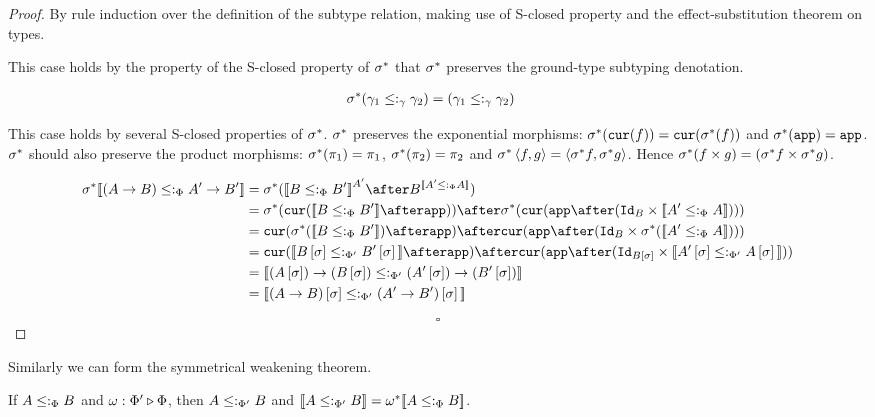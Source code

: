 \documentclass{Report}
\begin{document}
\begin{proof}
    By rule induction over the definition of the subtype relation, making use of S-closed property and the effect-substitution theorem on types.


This case holds by the property of the S-closed property of $\sigma^*$ that $\sigma^*$ preserves the ground-type subtyping denotation.

\begin{align}
    \sigma^*(\gamma_1\leq:_\gamma\gamma_2) &= (\gamma_1\leq:_\gamma\gamma_2)
\end{align}




This case holds by several S-closed properties of $\sigma^*$. $\sigma^*$ preserves the exponential morphisms: $\sigma^*(\texttt{cur}(f)) = \texttt{cur}(\sigma^*(f))$ and $\sigma^*(\texttt{app}) = \texttt{app}$. $\sigma^*$ should also preserve the product morphisms: $\sigma^*(\pi_1) = \pi_1$, $\sigma^*(\pi_2) = \pi_2$ and $\sigma^*\left\langle f, g\right\rangle = \left\langle\sigma^* f, \sigma^* g\right\rangle$. Hence $\sigma^*(f \times g) = (\sigma^* f \times \sigma^* g)$.

\begin{align}
    \si\star\deno{(\ab)\subtypep\fntype{A'}{B'}} &= \si\star(\deno{B\subtypep B'}^{A'}\after B^{\deno{A'\subtypep A}})\\
    &= \si\star(\cur{\deno{B\subtypep B'}\after\app})\after\si\star(\cur{\app\after(\Id{B}\times\deno{A'\subtypep A})})\\
    & = \cur{\si\star(\deno{B\subtypep B'})\after\app}\after\cur{\app\after(\Id{B}\times\si\star(\deno{A'\subtypep A}))}\\
    & = \cur{\deno{B\ssi\subtypepp B'\ssi}\after\app}\after\cur{\app\after(\Id{B\ssi}\times\deno{A'\ssi\subtypepp A\ssi})}\\
    &= \deno{\fntype{(A\ssi)}{(B\ssi)}\subtypepp\fntype{(A'\ssi)}{(B'\ssi)}}\\
    &= \deno{(\ab)\ssi\subtypepp(\fntype{A'}{B'})\ssi}
\end{align}


$$\square$$
\end{proof}


Similarly we can form the symmetrical weakening theorem.

\begin{theorem}
    If $A \leq:_\Phi B$ and $\omega : \Phi' \triangleright \Phi$, then $A \leq:_{\Phi'} B$ and ${\bf [\![}A\leq:_{\Phi'} B{\bf ]\!]} = \omega^*{\bf [\![}A\leq:_\Phi B{\bf ]\!]}$.
\end{theorem}
\end{document}
